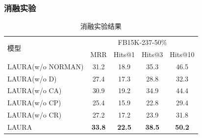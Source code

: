 \documentclass[algorithmlist, AutoFakeBold, AutoFakeSlant, figurelist, tablelist, nomlist, engineering]{seuthesix}
\begin{document}
\subsubsection{消融实验}
\begin{table}[t]
  \centering
  \caption{消融实验结果}
  \begin{tabular*}{0.95\textwidth}{@{\extracolsep{\fill}}lcccc}
    \toprule[1pt]
    \multirow{2}{*}{模型} & \multicolumn{4}{c}{FB15K-237-50\%} \\
      & MRR & Hits@1 & Hits@3 & Hits@10 \\ \hline
    LAURA(w/o NORMAN) & 31.2 & 18.9 & 35.3 & 46.5 \\
    LAURA(w/o D) & 27.4 & 17.3 & 28.8 & 32.3 \\
    LAURA(w/o CA) & 30.9 & 19.2 & 34.9 & 44.4 \\
    LAURA(w/o CP) & 25.4 & 15.9 & 22.8 & 29.4 \\
    LAURA(w/o CR) & 27.2 & 17.2 & 23.9 & 31.8 \\
    LAURA & \textbf{33.8} & \textbf{22.5} & \textbf{38.5} & \textbf{50.2} \\
    \bottomrule[1pt]
  \end{tabular*}
  \label{Experiment2_ablation}
\end{table}
\end{document}
